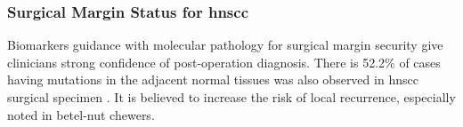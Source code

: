 \documentclass[12pt, a4paper]{article}
\begin{document}



\subsubsection{Surgical Margin Status for \acrshort{hnscc}}

Biomarkers guidance with molecular pathology for surgical margin security give clinicians strong confidence of post-operation diagnosis.
%
There is 52.2\% of cases having mutations in the adjacent normal tissues was also observed in \acrshort{hnscc} surgical specimen \citep{Singh2016}. It is believed to increase the risk of local recurrence, especially noted in betel-nut chewers\citep{DPSlaughterHWSouthwick1953}\citep{Liao2014}.
\end{document}
